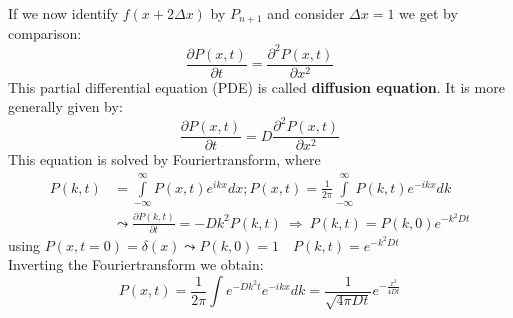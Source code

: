 If we now identify $f(x+2\Delta x)$ by $P_{n+1}$ and consider $\Delta x=1$ we get by comparison:
\begin{equation*}
	\frac{\partial P(x,t)}{\partial t}=\frac{\partial^2 P(x,t)}{\partial x^2}
\end{equation*}
This partial differential equation (PDE) is called \textbf{diffusion equation}. It is more generally given by:
\begin{equation*}
	\frac{\partial P(x,t)}{\partial t}=D\frac{\partial^2P(x,t)}{\partial x^2}
\end{equation*}
This equation is solved by Fouriertransform, where
\begin{align*}
	P(k,t)&=\int\limits_{-\infty}^\infty P(x,t)e^{ikx}dx; P(x,t)=\frac{1}{2\pi}\int\limits_{-\infty}^\infty P(k,t)e^{-ikx}dk\\
	&\leadsto\frac{\partial P(k,t)}{\partial t}=-Dk^2P(k,t)\ \Rightarrow \ P(k,t)=P(k,0)e^{-k^2Dt}
\end{align*}
using $P(x,t=0)=\delta(x)\leadsto P(k,0)=1\quad P(k,t)=e^{-k^2Dt}$\\
Inverting the Fouriertransform we obtain:
\begin{equation*}
	P(x,t)=\frac{1}{2\pi}\int e^{-Dk^2t}e^{-ikx}dk=\frac{1}{\sqrt{4\pi Dt}}e^{-\frac{x^2}{4Dt}}
\end{equation*}
